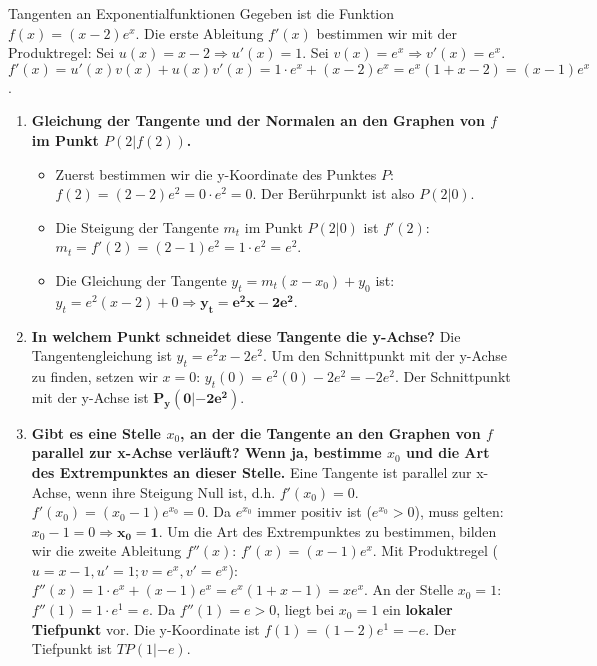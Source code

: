 \begin{loesungsumgebung}{Tangenten an Exponentialfunktionen}
Gegeben ist die Funktion $f(x) = (x-2)e^x$.
Die erste Ableitung $f'(x)$ bestimmen wir mit der Produktregel:
Sei $u(x) = x-2 \Rightarrow u'(x) = 1$.
Sei $v(x) = e^x \Rightarrow v'(x) = e^x$.
$f'(x) = u'(x)v(x) + u(x)v'(x) = 1 \cdot e^x + (x-2)e^x = e^x(1 + x - 2) = (x-1)e^x$.

\begin{enumerate}[label=(\alph*)]
    \item \textbf{Gleichung der Tangente und der Normalen an den Graphen von $f$ im Punkt $P(2|f(2))$.}
    \begin{itemize}
        \item Zuerst bestimmen wir die y-Koordinate des Punktes $P$:
        $f(2) = (2-2)e^2 = 0 \cdot e^2 = 0$. Der Berührpunkt ist also $P(2|0)$.
        \item Die Steigung der Tangente $m_t$ im Punkt $P(2|0)$ ist $f'(2)$:
        $m_t = f'(2) = (2-1)e^2 = 1 \cdot e^2 = e^2$.
        \item Die Gleichung der Tangente $y_t = m_t(x-x_0) + y_0$ ist:
        $y_t = e^2(x-2) + 0 \Rightarrow \mathbf{y_t = e^2x - 2e^2}$.
    \end{itemize}

    \item \textbf{In welchem Punkt schneidet diese Tangente die y-Achse?}
    Die Tangentengleichung ist $y_t = e^2x - 2e^2$.
    Um den Schnittpunkt mit der y-Achse zu finden, setzen wir $x=0$:
    $y_t(0) = e^2(0) - 2e^2 = -2e^2$.
    Der Schnittpunkt mit der y-Achse ist $\mathbf{P_y(0|-2e^2)}$.

    \item \textbf{Gibt es eine Stelle $x_0$, an der die Tangente an den Graphen von $f$ parallel zur x-Achse verläuft? Wenn ja, bestimme $x_0$ und die Art des Extrempunktes an dieser Stelle.}
    Eine Tangente ist parallel zur x-Achse, wenn ihre Steigung Null ist, d.h. $f'(x_0)=0$.
    $f'(x_0) = (x_0-1)e^{x_0} = 0$.
    Da $e^{x_0}$ immer positiv ist ($e^{x_0} > 0$), muss gelten:
    $x_0-1 = 0 \Rightarrow \mathbf{x_0 = 1}$.
    Um die Art des Extrempunktes zu bestimmen, bilden wir die zweite Ableitung $f''(x)$:
    $f'(x) = (x-1)e^x$. Mit Produktregel ($u=x-1, u'=1; v=e^x, v'=e^x$):
    $f''(x) = 1 \cdot e^x + (x-1)e^x = e^x(1+x-1) = xe^x$.
    An der Stelle $x_0=1$:
    $f''(1) = 1 \cdot e^1 = e$.
    Da $f''(1) = e > 0$, liegt bei $x_0=1$ ein \textbf{lokaler Tiefpunkt} vor.
    Die y-Koordinate ist $f(1) = (1-2)e^1 = -e$.
    Der Tiefpunkt ist $TP(1|-e)$.


\end{enumerate}
\end{loesungsumgebung}

